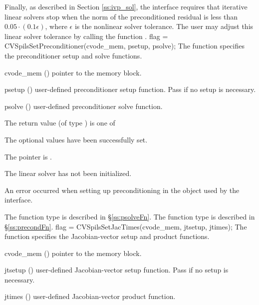 Finally, as described in Section \ref{ss:ivp_sol}, the {\cvspils}
interface requires that iterative linear solvers stop when the norm of
the preconditioned residual is less than $0.05 \cdot (0.1 \epsilon)$,
where $\epsilon$ is the nonlinear solver tolerance.  The user may
adjust this linear solver tolerance by calling the function
.
{
  flag = CVSpilsSetPreconditioner(cvode\_mem, psetup, psolve);
}
{
  The function  specifies the preconditioner
  setup and solve functions.
}
{
  \begin{args}
  \item[cvode\_mem] ()
    pointer to the {\cvode} memory block.
  \item[psetup] ()
    user-defined preconditioner setup function.
    Pass  if no setup is necessary.
  \item[psolve] ()
    user-defined preconditioner solve function.
  \end{args}
}
{
  The return value  (of type ) is one of
  \begin{args}
  \item[\Id{CVSPILS\_SUCCESS}]
    The optional values have been successfully set.
  \item[\Id{CVSPILS\_MEM\_NULL}]
    The  pointer is .
  \item[\Id{CVSPILS\_LMEM\_NULL}]
    The {\cvspils} linear solver has not been initialized.
  \item[\Id{CVSPILS\_SUNLS\_FAIL}]
    An error occurred when setting up preconditioning in the
    {\sunlinsol} object used by the {\cvspils} interface.
  \end{args}
}
{
   The function type  is described in \S\ref{ss:psolveFn}.
   The function type  is described in \S\ref{ss:precondFn}.
}
{
  flag = CVSpilsSetJacTimes(cvode\_mem, jtsetup, jtimes);
}
{
  The function  specifies the Jacobian-vector
  setup and product functions.
}
{
  \begin{args}
  \item[cvode\_mem] ()
    pointer to the {\cvode} memory block.
  \item[jtsetup] ()
    user-defined Jacobian-vector setup function.
    Pass  if no setup is necessary.
  \item[jtimes] ()
    user-defined Jacobian-vector product function.
  \end{args}
}
